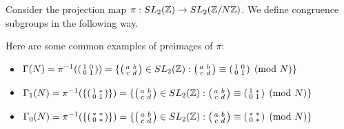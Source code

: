Consider the projection map $\pi: SL_2(\mathbb{Z}) \rightarrow SL_2(\mathbb{Z}/N\mathbb{Z})$. We define congruence subgroups in the following way.

\begin{example}\label{example:1_congsgp}
Here are some common examples of preimages of $\pi$:

\begin{itemize}
    \item $\Gamma(N) = \pi^{-1} (\begin{psmallmatrix}
        1 & 0 \\ 0 & 1
    \end{psmallmatrix}) = \{ \begin{psmallmatrix}
        a & b \\ c & d 
    \end{psmallmatrix} \in SL_2(\mathbb{Z}): \begin{psmallmatrix}
        a & b \\ c & d 
    \end{psmallmatrix} \equiv \begin{psmallmatrix}
        1 & 0 \\ 0 & 1 
    \end{psmallmatrix} \pmod{N}\}$
    \item $\Gamma_1(N) = \pi^{-1} (\{\begin{psmallmatrix}
        1 & \ast \\ 0 & 1
    \end{psmallmatrix}\}) = \{ \begin{psmallmatrix}
        a & b \\ c & d 
    \end{psmallmatrix} \in SL_2(\mathbb{Z}): \begin{psmallmatrix}
        a & b \\ c & d 
    \end{psmallmatrix} \equiv \begin{psmallmatrix}
        1 & \ast \\ 0 & 1 
    \end{psmallmatrix} \pmod{N}\}$
    \item $\Gamma_0(N) = \pi^{-1} (\{\begin{psmallmatrix}
        \ast & \ast \\ 0 & \ast
    \end{psmallmatrix}\}) = \{ \begin{psmallmatrix}
        a & b \\ c & d 
    \end{psmallmatrix} \in SL_2(\mathbb{Z}): \begin{psmallmatrix}
        a & b \\ c & d 
    \end{psmallmatrix} \equiv \begin{psmallmatrix}
        \ast & \ast \\ 0 & \ast 
    \end{psmallmatrix} \pmod{N}\}$
\end{itemize}
\end{example}

